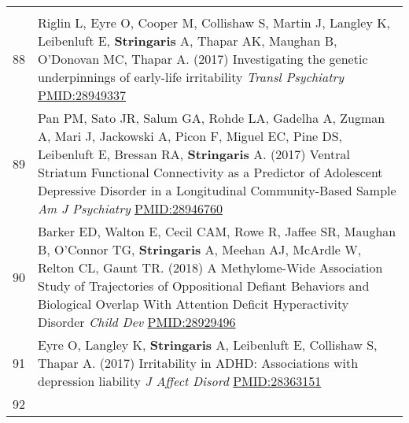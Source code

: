 \documentclass[
]{article}
\begin{document}
\begin{longtable}[]{@{}ll@{}}
\begin{minipage}[t]{0.94\columnwidth}
\end{minipage}\tabularnewline
\begin{minipage}[t]{0.01\columnwidth}\raggedright
88\strut
\end{minipage} & \begin{minipage}[t]{0.94\columnwidth}\raggedright
Riglin L, Eyre O, Cooper M, Collishaw S, Martin J, Langley K, Leibenluft
E, \textbf{Stringaris} A, Thapar AK, Maughan B, O'Donovan MC, Thapar A.
(2017) Investigating the genetic underpinnings of early-life
irritability \emph{Transl Psychiatry} \url{PMID:28949337}\strut
\end{minipage}\tabularnewline
\begin{minipage}[t]{0.01\columnwidth}\raggedright
89\strut
\end{minipage} & \begin{minipage}[t]{0.94\columnwidth}\raggedright
Pan PM, Sato JR, Salum GA, Rohde LA, Gadelha A, Zugman A, Mari J,
Jackowski A, Picon F, Miguel EC, Pine DS, Leibenluft E, Bressan RA,
\textbf{Stringaris} A. (2017) Ventral Striatum Functional Connectivity
as a Predictor of Adolescent Depressive Disorder in a Longitudinal
Community-Based Sample \emph{Am J Psychiatry} \url{PMID:28946760}\strut
\end{minipage}\tabularnewline
\begin{minipage}[t]{0.01\columnwidth}\raggedright
90\strut
\end{minipage} & \begin{minipage}[t]{0.94\columnwidth}\raggedright
Barker ED, Walton E, Cecil CAM, Rowe R, Jaffee SR, Maughan B, O'Connor
TG, \textbf{Stringaris} A, Meehan AJ, McArdle W, Relton CL, Gaunt TR.
(2018) A Methylome-Wide Association Study of Trajectories of
Oppositional Defiant Behaviors and Biological Overlap With Attention
Deficit Hyperactivity Disorder \emph{Child Dev}
\url{PMID:28929496}\strut
\end{minipage}\tabularnewline
\begin{minipage}[t]{0.01\columnwidth}\raggedright
91\strut
\end{minipage} & \begin{minipage}[t]{0.94\columnwidth}\raggedright
Eyre O, Langley K, \textbf{Stringaris} A, Leibenluft E, Collishaw S,
Thapar A. (2017) Irritability in ADHD: Associations with depression
liability \emph{J Affect Disord} \url{PMID:28363151}\strut
\end{minipage}\tabularnewline
\begin{minipage}[t]{0.01\columnwidth}\raggedright
92\strut
\end{minipage} & \begin{minipage}[t]{0.94\columnwidth}\raggedright

\end{minipage}
\end{longtable}
\end{document}
